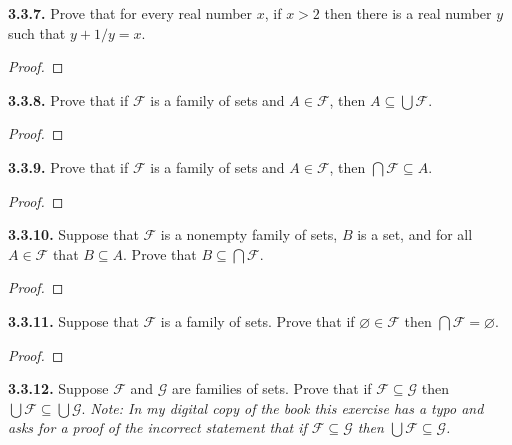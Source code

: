 \documentclass[12pt]{amsart}
\newenvironment{statement}[1]{\smallskip\noindent\color[rgb]{.6627, .3529, .6314} {\bf #1.}}{}
\theoremstyle{definition}
\theoremstyle{remark}
\begin{document}
\begin{statement}{3.3.7}
Prove that for every real number $x$, if $x > 2$ then there is a real number $y$ such that $y + 1/y = x$.
\end{statement}

\begin{proof}
\end{proof}


\begin{statement}{3.3.8}
Prove that if $\mathcal{F}$ is a family of sets and $A \in \mathcal{F}$, then $A \subseteq \bigcup \mathcal{F}$.
\end{statement}

\begin{proof}
\end{proof}


\begin{statement}{3.3.9}
Prove that if $\mathcal{F}$ is a family of sets and $A \in \mathcal{F}$, then $\bigcap \mathcal{F} \subseteq A$.
\end{statement}

\begin{proof}
\end{proof}


\begin{statement}{3.3.10}
Suppose that $\mathcal{F}$ is a nonempty family of sets, $B$ is a set, and for all $A \in \mathcal{F}$ that $B \subseteq A$.
Prove that $B \subseteq \bigcap \mathcal{F}$.
\end{statement}

\begin{proof}
\end{proof}


\begin{statement}{3.3.11}
Suppose that $\mathcal{F}$ is a family of sets.
Prove that if $\varnothing \in \mathcal{F}$ then $\bigcap \mathcal{F} = \varnothing$.
\end{statement}

\begin{proof}
\end{proof}


\begin{statement}{3.3.12}
Suppose $\mathcal{F}$ and $\mathcal{G}$ are families of sets.
Prove that if $\mathcal{F} \subseteq \mathcal{G}$ then $\bigcup \mathcal{F} \subseteq \bigcup \mathcal{G}$.
\emph{Note: In my digital copy of the book this exercise has a typo and asks for a proof of the incorrect statement that if $\mathcal{F} \subseteq \mathcal{G}$ then $\bigcup \mathcal{F} \subseteq \mathcal{G}$.}
\end{statement}
\end{document}
